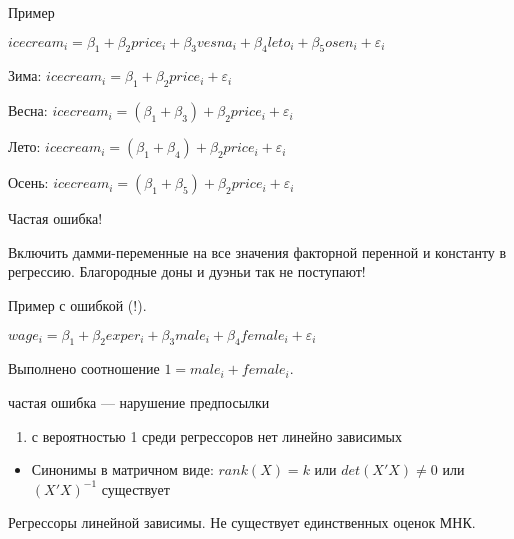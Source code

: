 \documentclass[ignorenonframetext,]{beamer}
\begin{document}
\begin{frame}{Пример}

$icecream_i=\beta_1 + \beta_2 price_i + \beta_3 vesna_i + \beta_4 leto_i + \beta_5 osen_i + \varepsilon_i$

Зима: $icecream_i=\beta_1 + \beta_2 price_i + \varepsilon_i$

Весна:
$icecream_i=(\beta_1 + \beta_3) + \beta_2 price_i + \varepsilon_i$

Лето: $icecream_i=(\beta_1 + \beta_4) + \beta_2 price_i + \varepsilon_i$

Осень:
$icecream_i=(\beta_1 + \beta_5) + \beta_2 price_i + \varepsilon_i$

\end{frame}

\begin{frame}{Частая ошибка!}

Включить дамми-переменные на все значения факторной перенной и константу
в регрессию. Благородные доны и дуэньи так не поступают!

Пример с ошибкой (!).

$wage_i = \beta_1 + \beta_2 exper_i + \beta_3 male_i + \beta_4 female_i +\varepsilon_i$

Выполнено соотношение $1 = male_i + female_i$.

\end{frame}

\begin{frame}{частая ошибка --- нарушение предпосылки}

\begin{enumerate}
\def\labelenumi{\arabic{enumi}.}
\setcounter{enumi}{7}
\itemsep1pt\parskip0pt
\item
  с вероятностью 1 среди регрессоров нет линейно зависимых
\end{enumerate}

\begin{itemize}
\itemsep1pt\parskip0pt
\item
  Синонимы в матричном виде: $rank(X)=k$ или $det(X'X)\neq 0$ или
  $(X'X)^{-1}$ существует
\end{itemize}

Регрессоры линейной зависимы. Не существует единственных оценок МНК.

\end{frame}
\end{document}
